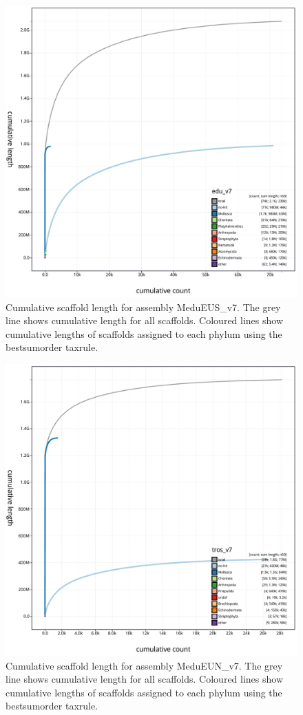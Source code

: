 \documentclass[11pt, a4paper]{article}
\begin{document}
\begin{figure}
	\includegraphics[width=\linewidth]{figures/btk_cumulative_MeduEUS_v7}
	\caption{Cumulative scaffold length for assembly MeduEUS\_v7. The grey line shows cumulative length for all scaffolds. Coloured lines show cumulative lengths of scaffolds assigned to each phylum using the bestsumorder taxrule.}
	\label{supfig:btk-cumul-MeduEUS}
\end{figure}

\begin{figure}
	\includegraphics[width=\linewidth]{figures/btk_cumulative_MeduEUN_v7}
	\caption{Cumulative scaffold length for assembly MeduEUN\_v7. The grey line shows cumulative length for all scaffolds. Coloured lines show cumulative lengths of scaffolds assigned to each phylum using the bestsumorder taxrule.}
	\label{supfig:btk-cumul-MeduEUN}
\end{figure}
\end{document}
